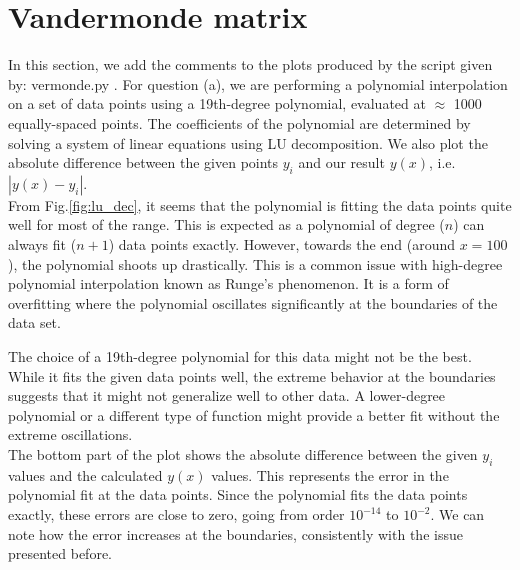 %
\section{Vandermonde matrix}

In this section, we add the comments to the plots produced by the script given by: vermonde.py
.
For question (a), we are performing a polynomial interpolation on a set of data points using a 19th-degree polynomial, evaluated at $\approx$ 1000 equally-spaced points. The coefficients of the polynomial are determined by solving a system of linear equations using LU decomposition. We also plot the absolute difference between the given points $y_{i}$ and our result $y(x)$, i.e. $|y(x) - y_{i}|$. \\

From Fig.\ref{fig:lu_dec}, it seems that the polynomial is fitting the data points quite well for most of the range. This is expected as a polynomial of degree ($n$) can always fit ($n+1$) data points exactly. However, towards the end (around $x=100$), the polynomial shoots up drastically. This is a common issue with high-degree polynomial interpolation known as Runge's phenomenon. It is a form of overfitting where the polynomial oscillates significantly at the boundaries of the data set.

The choice of a 19th-degree polynomial for this data might not be the best. While it fits the given data points well, the extreme behavior at the boundaries suggests that it might not generalize well to other data. A lower-degree polynomial or a different type of function might provide a better fit without the extreme oscillations. \\

The bottom part of the plot shows the absolute difference between the given $y_{i}$ values and the calculated $y(x)$ values. This represents the error in the polynomial fit at the data points. Since the polynomial fits the data points exactly, these errors are close to zero, going from order $10^{-14}$ to $10^{-2}$. We can note how the error increases at the boundaries, consistently with the issue presented before. \\

